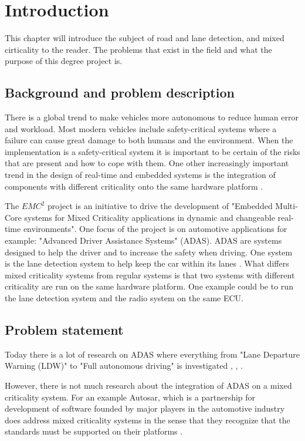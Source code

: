 \chapter{Introduction}
\label{sec:introduction}
This chapter will introduce the subject of road and lane detection, and mixed cirticality to the reader. The problems that exist in the field and what the purpose of this degree project is.


\section{Background and problem description}
There is a global trend to make vehicles more autonomous to reduce human error and workload. Most modern vehicles include safety-critical systems where a failure can cause great damage to both humans and the environment. When the implementation is a safety-critical system it is important to be certain of the risks that are present and how to cope with them. One other increasingly important trend in the design of real-time and embedded systems is the integration of components with different criticality onto the same hardware platform \cite{burns2013mixed}.

The $EMC^2$ project \cite{eu} is an initiative to drive the development of "Embedded Multi-Core systems for Mixed Criticality applications in dynamic and changeable real-time environments". One focus of the project is on automotive applications for example: "Advanced Driver Assistance Systems" (ADAS). ADAS are systems designed to help the driver and to increase the safety when driving. One system is the lane detection system to help keep the car within its lanes \cite{BarHillel2014}. What differs mixed criticality systems from regular systems is that two systems with different criticality are run on the same hardware platform. One example could be to run the lane detection system and the radio system on the same ECU.


\section{Problem statement}
Today there is a lot of research on ADAS where everything from "Lane Departure Warning (LDW)" to "Full autonomous driving" is investigated \cite{BarHillel2014}, \cite{Yenikaya:2013:KVR:2522968.2522970}, \cite{mccall2006video}. 

However, there is not much research about the integration of ADAS on a mixed criticality system. For an example Autosar, which is a partnership for development of software founded by major players in the automotive industry does address mixed criticality systems in the sense that they recognize that the standards must be supported on their platforms \cite{burns2013mixed} \cite{auto}.

